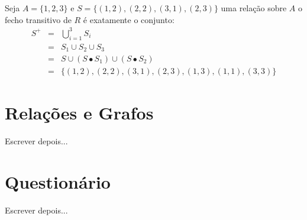 \begin{exemplo}
	Seja $A = \{1, 2, 3\}$ e $S =\{(1, 2), (2, 2), (3, 1), (2, 3)\}$ uma relação sobre $A$ o fecho transitivo de $R$ é exatamente o conjunto:
	\begin{eqnarray*}
		S^+ & = & \bigcup_{i = 1}^3 S_i\\
		 & = & S_1 \cup S_2 \cup S_3\\
		 & = & S \cup (S \bullet S_1) \cup (S \bullet S_2)\\
		 & = & \{(1, 2), (2, 2), (3, 1), (2, 3), (1, 3), (1, 1), (3, 3)\}
	\end{eqnarray*}
\end{exemplo}

\section{Relações e Grafos}\label{sec:RelacoesGrafos}

{\color{red}Escrever depois...}

\section{Questionário}\label{sec:Questionario3part1}

{\color{red}Escrever depois...}






